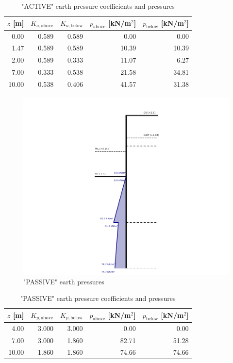 \begin{table}[H]
  \centering
  \caption{"ACTIVE" earth pressure coefficients and pressures}
  \label{tab:appendix_active_pressures}
  \small
  \setlength{\tabcolsep}{8pt}
  \renewcommand{\arraystretch}{1.15}
  \begin{tabular}{@{}r r r r r@{}}
    \toprule
    $z$ [m] &
    $K_{a,\text{above}}$ &
    $K_{a,\text{below}}$ &
    $p_{\text{above}}$ [kN/m$^2$] &
    $p_{\text{below}}$ [kN/m$^2$] \\
    \midrule
     0.00 & 0.589 & 0.589 &  0.00 &  0.00 \\
     1.47 & 0.589 & 0.589 & 10.39 & 10.39 \\
     2.00 & 0.589 & 0.333 & 11.07 &  6.27 \\
     7.00 & 0.333 & 0.538 & 21.58 & 34.81 \\
    10.00 & 0.538 & 0.406 & 41.57 & 31.38 \\
    \bottomrule
  \end{tabular}
\end{table}

\begin{figure}[H]
    \centering
    \includegraphics[width=0.75\linewidth]{figures/appendix-i/passive_earth_pressure.png}
    \caption{"PASSIVE" earth pressures}
    \label{fig:appendix_earth_pressure}
\end{figure}

\begin{table}[H]
  \centering
  \caption{"PASSIVE" earth pressure coefficients and pressures}
  \label{tab:appendix_passive_pressures}
  \small
  \setlength{\tabcolsep}{8pt}
  \renewcommand{\arraystretch}{1.15}
  \begin{tabular}{@{}r r r r r@{}}
    \toprule
    $z$ [m] &
    $K_{p,\text{above}}$ &
    $K_{p,\text{below}}$ &
    $p_{\text{above}}$ [kN/m$^2$] &
    $p_{\text{below}}$ [kN/m$^2$] \\
    \midrule
     4.00 & 3.000 & 3.000 &  0.00 &  0.00 \\
     7.00 & 3.000 & 1.860 & 82.71 & 51.28 \\
    10.00 & 1.860 & 1.860 & 74.66 & 74.66 \\
    \bottomrule
  \end{tabular}
\end{table}

